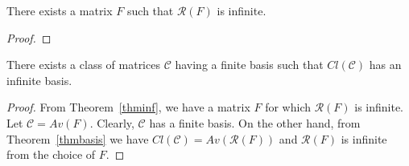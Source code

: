 \begin{thm}
\label{thminf}
There exists a matrix $F$ such that $\mathcal{R}(F)$ is infinite.
\end{thm}
\begin{proof}
\end{proof}
\begin{cor}
There exists a class of matrices $\mathcal{C}$ having a finite basis such that $Cl(\mathcal{C})$ has an infinite basis.
\end{cor}
\begin{proof}
From Theorem~\ref{thminf}, we have a matrix $F$ for which $\mathcal{R}(F)$ is infinite. Let $\mathcal{C}=Av(F)$. Clearly, $\mathcal{C}$ has a finite basis. On the other hand, from Theorem~\ref{thmbasis} we have $Cl(\mathcal{C})=Av(\mathcal{R}(F))$ and $\mathcal{R}(F)$ is infinite from the choice of $F$.
\end{proof}